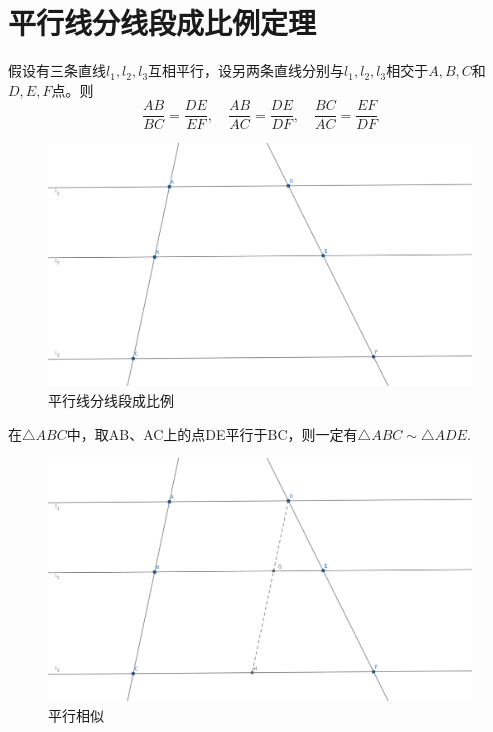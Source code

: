  
\section{平行线分线段成比例定理}
\begin{theorem}[平行线分线段成比例定理]
    假设有三条直线$l_1,l_2,l_3$互相平行，设另两条直线分别与$l_1,l_2,l_3$相交于$A,B,C$和$D,E,F$点。则
    $$\frac{AB}{BC} = \frac{DE}{EF},\quad 
    \frac{AB}{AC} = \frac{DE}{DF}, \quad 
    \frac{BC}{AC} = \frac{EF}{DF}$$
\end{theorem}
\begin{figure}[h]
    \centering
    \includegraphics[width=0.8\linewidth]{figures/平行线分线段成比例.png}
    \caption{平行线分线段成比例}
\end{figure}

\begin{proposition}[平行相似]
    在$\triangle ABC$中，取AB、AC上的点DE平行于BC，则一定有$\triangle ABC \sim \triangle ADE$.
\end{proposition}

\begin{figure}[h]
    \centering
    \includegraphics[width=0.8\linewidth]{figures/平行线分线段成比例 (1).png}
    \caption{平行相似}
\end{figure}


